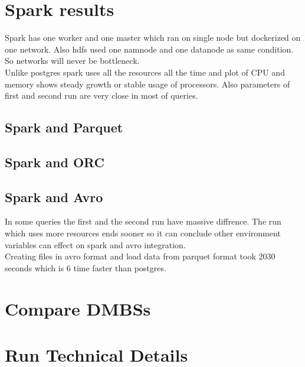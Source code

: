\documentclass{article}
\begin{document}
    \section{Spark results}
    Spark has one worker and one master which ran on single node but dockerized on one network. Also hdfs used one namnode and one datanode as same condition. So networks will never be bottleneck.\\
    Unlike postgres spark uses all the resources all the time and plot of CPU and memory shows steady growth or stable usage of processors. Also parameters of first and second run are very close in most of queries.\\

    \subsection{Spark and Parquet}
    

    \subsection{Spark and ORC}
    

    \subsection{Spark and Avro}
    In some queries the first and the second run have massive diffrence. The run which uses more resources ends sooner so it can conclude other environment variables can effect on spark and avro integration.\\
    Creating files in avro format and load data from parquet format took 2030 seconds which is 6 time faster than postgres.
    
    \section{Compare DMBSs}
    
    \section{Run Technical Details}
    
    
\end{document}
